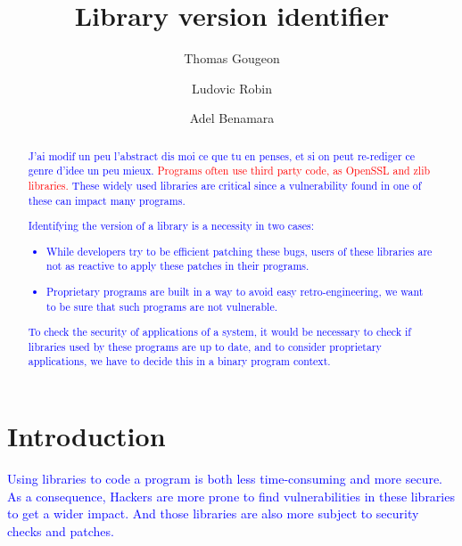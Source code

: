 \documentclass{article}
\title{Library version identifier}
\author{Thomas Gougeon \and Ludovic Robin \and Adel Benamara}
\newcommand{\ludo}[1]{\textcolor{blue}{#1}}
\newcommand{\thom}[1]{\textcolor{red}{#1}}
\begin{document}
	\maketitle
	
	\begin{abstract}
        \ludo{J'ai modif un peu l'abstract dis moi ce que tu en penses, et si
        on peut re-rediger ce genre d'idee un peu mieux.}
        \thom{Programs often use third party code, as OpenSSL and zlib
        libraries.}
        \ludo{These widely used libraries are critical since a vulnerability
        found in one of these can impact many programs.}
        \ludo{Identifying the version of a library is a necessity in two
        cases:
        \begin{itemize}
            \item While developers try to be efficient patching these bugs,
                users of these libraries are not as reactive to apply these
                patches in their programs.
            \item Proprietary programs are built in a way to avoid easy
                retro-engineering, we want to be sure that such programs
                are not vulnerable.
        \end{itemize}
        }
%		
        \ludo{To check the security of applications of a system, it would be
        necessary to check if libraries used by these programs are up to date,
        and to consider proprietary applications, we have to decide this in a
        binary program context.}
	
	\end{abstract}

\section{Introduction}

    \ludo{Using libraries to code a program is both less time-consuming and more secure. }
    \ludo{As a consequence, } 
    \ludo{Hackers are more prone to find vulnerabilities in these libraries
    to get a wider impact. And those libraries are also more subject to
    security checks and patches.}
     
\end{document}
